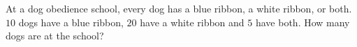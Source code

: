 At a dog obedience school, every dog has a blue ribbon, a white ribbon, or both. $10$ dogs have a blue ribbon, $20$ have a white ribbon and $5$ have both. How many dogs are at the school?
